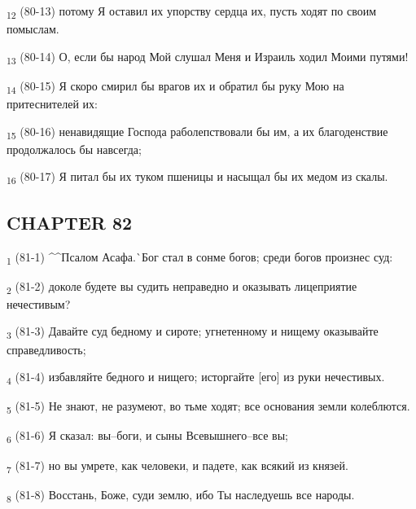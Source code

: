 \begin{tcolorbox}
\textsubscript{12} (80-13) потому Я оставил их упорству сердца их, пусть ходят по своим помыслам.
\end{tcolorbox}
\begin{tcolorbox}
\textsubscript{13} (80-14) О, если бы народ Мой слушал Меня и Израиль ходил Моими путями!
\end{tcolorbox}
\begin{tcolorbox}
\textsubscript{14} (80-15) Я скоро смирил бы врагов их и обратил бы руку Мою на притеснителей их:
\end{tcolorbox}
\begin{tcolorbox}
\textsubscript{15} (80-16) ненавидящие Господа раболепствовали бы им, а их благоденствие продолжалось бы навсегда;
\end{tcolorbox}
\begin{tcolorbox}
\textsubscript{16} (80-17) Я питал бы их туком пшеницы и насыщал бы их медом из скалы.
\end{tcolorbox}
\subsection{CHAPTER 82}
\begin{tcolorbox}
\textsubscript{1} (81-1) ^^Псалом Асафа.^^ Бог стал в сонме богов; среди богов произнес суд:
\end{tcolorbox}
\begin{tcolorbox}
\textsubscript{2} (81-2) доколе будете вы судить неправедно и оказывать лицеприятие нечестивым?
\end{tcolorbox}
\begin{tcolorbox}
\textsubscript{3} (81-3) Давайте суд бедному и сироте; угнетенному и нищему оказывайте справедливость;
\end{tcolorbox}
\begin{tcolorbox}
\textsubscript{4} (81-4) избавляйте бедного и нищего; исторгайте [его] из руки нечестивых.
\end{tcolorbox}
\begin{tcolorbox}
\textsubscript{5} (81-5) Не знают, не разумеют, во тьме ходят; все основания земли колеблются.
\end{tcolorbox}
\begin{tcolorbox}
\textsubscript{6} (81-6) Я сказал: вы--боги, и сыны Всевышнего--все вы;
\end{tcolorbox}
\begin{tcolorbox}
\textsubscript{7} (81-7) но вы умрете, как человеки, и падете, как всякий из князей.
\end{tcolorbox}
\begin{tcolorbox}
\textsubscript{8} (81-8) Восстань, Боже, суди землю, ибо Ты наследуешь все народы.
\end{tcolorbox}

